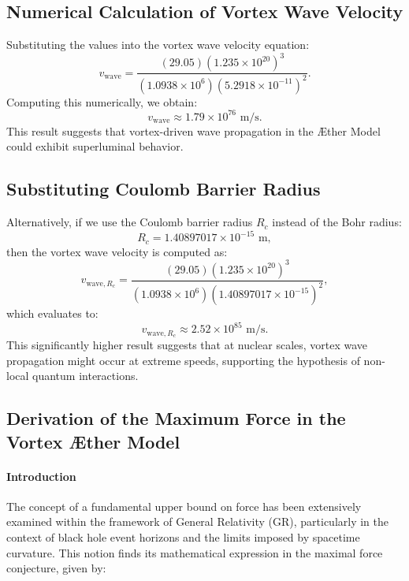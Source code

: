 \documentclass[a4paper,10pt]{article}
\begin{document}
    \subsection*{Numerical Calculation of Vortex Wave Velocity}
    Substituting the values into the vortex wave velocity equation:
    \begin{equation*}
        v_\text{wave} = \frac{(29.05) (1.235 \times 10^{20})^3}{(1.0938 \times 10^6) (5.2918 \times 10^{-11})^2}.
    \end{equation*}
    Computing this numerically, we obtain:
    \begin{equation*}
        v_\text{wave} \approx 1.79 \times 10^{76} \text{ m/s}.
    \end{equation*}
    This result suggests that vortex-driven wave propagation in the Æther Model could exhibit superluminal behavior.

    \subsection*{Substituting Coulomb Barrier Radius}
    Alternatively, if we use the Coulomb barrier radius $R_c$ instead of the Bohr radius:
    \begin{equation*}
        R_c = 1.40897017 \times 10^{-15} \text{ m},
    \end{equation*}
    then the vortex wave velocity is computed as:
    \begin{equation*}
        v_{\text{wave}, R_c} = \frac{(29.05) (1.235 \times 10^{20})^3}{(1.0938 \times 10^6) (1.40897017 \times 10^{-15})^2},
    \end{equation*}
    which evaluates to:
    \begin{equation*}
        v_{\text{wave}, R_c} \approx 2.52 \times 10^{85} \text{ m/s}.
    \end{equation*}
    This significantly higher result suggests that at nuclear scales, vortex wave propagation might occur at extreme speeds, supporting the hypothesis of non-local quantum interactions.

    
\subsection{Derivation of the Maximum Force in the Vortex Æther Model}

\paragraph*{Introduction}
The concept of a fundamental upper bound on force has been extensively examined within the framework of General Relativity (GR), particularly in the context of black hole event horizons and the limits imposed by spacetime curvature. This notion finds its mathematical expression in the maximal force conjecture, given by:
\end{document}
